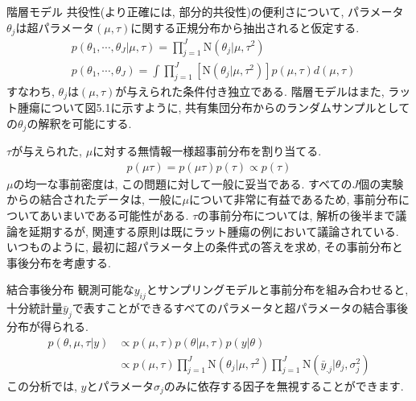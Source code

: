 \documentclass[10pt,dvipdfmx,a4]{beamer}
\newcommand{\eq}[1]{\begin{align}#1\end{align}}
\begin{document}

\begin{frame}{階層モデル}
共役性(より正確には, 部分的共役性)の便利さについて, パラメータ$\theta_j$は超パラメータ$(\mu,\tau)$に関する正規分布から抽出されると仮定する.
\eq{&p(\theta_1,\cdots,\theta_J|\mu,\tau)=\prod_{j=1}^J \text{N}(\theta_j|\mu,\tau^2)\\
&p(\theta_1,\cdots,\theta_J)=\int \prod_{j=1}^J [\text{N}(\theta_j|\mu,\tau^2)]p(\mu,\tau)d(\mu,\tau)\nonumber}
すなわち, $\theta_j$は$(\mu,\tau)$が与えられた条件付き独立である.
階層モデルはまた, ラット腫瘍について図5.1に示すように, 共有集団分布からのランダムサンプルとしての$\theta_j$の解釈を可能にする.
\end{frame}


\begin{frame}
$\tau$が与えられた, $\mu$に対する無情報一様超事前分布を割り当てる.
\eq{p(\mu\tau)=p(\mu\tau)p(\tau)\propto p(\tau)}
$\mu$の均一な事前密度は, この問題に対して一般に妥当である.
すべての$J$個の実験からの結合されたデータは, 一般に$\mu$について非常に有益であるため, 事前分布についてあいまいである可能性がある.
$\tau$の事前分布については, 解析の後半まで議論を延期するが, 関連する原則は既にラット腫瘍の例において議論されている.
いつものように, 最初に超パラメータ上の条件式の答えを求め, その事前分布と事後分布を考慮する.
\end{frame}


\begin{frame}{結合事後分布}
観測可能な$y_{ij}$とサンプリングモデルと事前分布を組み合わせると, 十分統計量$\bar{y}_{j}$で表すことができるすべてのパラメータと超パラメータの結合事後分布が得られる.
\eq{p(\theta,\mu,\tau|y)&\propto p(\mu,\tau)p(\theta|\mu,\tau)p(y|\theta)\nonumber \\
&\propto p(\mu,\tau)\prod_{j=1}^J\text{N}(\theta_j|\mu,\tau^2)\prod_{j=1}^J\text{N}(\bar{y}_{.j}|\theta_j,\sigma_j^2)}
この分析では, $y$とパラメータ$\sigma_j$のみに依存する因子を無視することができます.
\end{frame}

\end{document}
